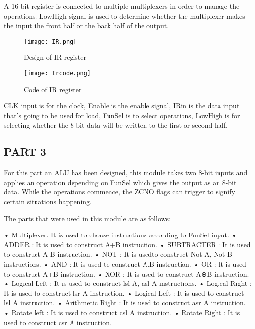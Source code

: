 \documentclass[pdftex,12pt,a4paper]{article}
\begin{document}
\begin{itemize}
A 16-bit register is connected to multiple multiplexers in order to manage the operations. LowHigh signal is used to determine whether the multiplexer makes the input the front half or the back half of the output. 

\begin{figure}[H]
	\centering
	\texttt{[image: IR.png]}	
	\caption{Design of IR register}
	\label{fig1-1}
\end{figure}

\begin{figure}[H]
	\centering
	\texttt{[image: Ircode.png]}	
	\caption{Code of IR register}
	\label{fig1-1}
\end{figure}

\singlespacing



CLK input is for the clock, Enable is the enable signal, IRin is the data input that's going to be used for load, FunSel is to select operations, LowHigh is for selecting whether the 8-bit data will be written to the first or second half.

\subsection{PART 3}
For this part an ALU has been designed, this module takes two 8-bit inputs and applies an operation depending on FunSel which gives the output as an 8-bit data. While the operations commence, the ZCNO flags can trigger to signify certain situations happening.

The parts that were used in this module are as follows:

• Multiplexer: It is used to choose instructions according to FunSel input.
\singlespacing
• ADDER : It is used to construct A+B instruction.
\singlespacing
• SUBTRACTER : It is used to construct A-B instruction.
\singlespacing
• NOT : It is usedto construct Not A, Not B instructions.
\singlespacing
• AND : It is used to construct A.B instruction.
\singlespacing
• OR : It is used to construct A+B instruction.
\singlespacing
• XOR : It is used to construct A⊕B instruction.
\singlespacing
• Logical Left : It is used to construct lsl A, asl A instructions.
\singlespacing
• Logical Right : It is used to construct lsr A instruction.
\singlespacing
• Logical Left : It is used to construct lsl A instruction.
\singlespacing
• Arithmetic Right : It is used to construct asr A instruction.
\singlespacing
• Rotate left : It is used to construct csl A instruction.
\singlespacing
• Rotate Right : It is used to construct csr A instruction.
\singlespacing


\end{itemize}
\end{document}
